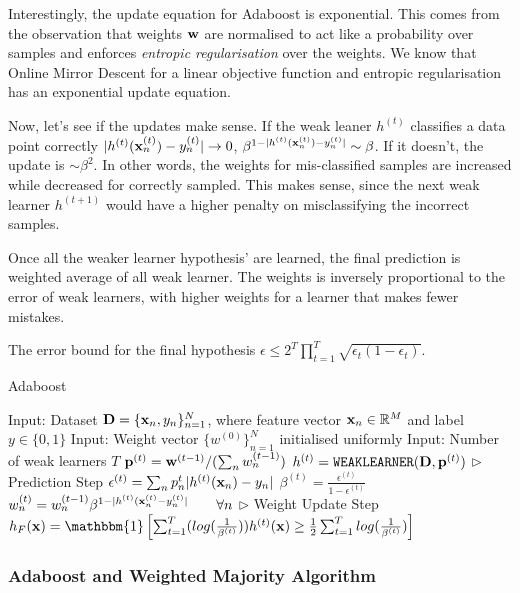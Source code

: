 \documentclass[11pt]{article}
\begin{document}
Interestingly, the update equation for Adaboost is exponential. This comes from the observation that weights $\mathbf{w}$ are normalised to act like a probability over samples and enforces \textit{entropic regularisation} over the weights. We know that Online Mirror Descent for a linear  objective function and entropic regularisation has an exponential update equation.

Now, let's see if the updates make sense. If the weak leaner $h^{(t)}$ classifies a data point correctly \ie $|h^{(t)}(\mathbf{x}_n^{(t)}) - y_n^{(t)}| \rightarrow 0$, $\beta^{1-|h^{(t)}(\mathbf{x}_n^{(t)}) - y_n^{(t)}|} \sim \beta$. If it doesn't, the update is $\sim \beta^2$. In other words, the weights for mis-classified samples are increased while decreased for correctly sampled. This makes sense, since the next weak learner $h^{(t+1)}$ would have a higher penalty on misclassifying the incorrect samples. 

Once all the weaker learner hypothesis' are learned, the final prediction is weighted average of all weak learner. The weights is inversely proportional to the error of weak learners, with higher weights for a learner that makes fewer mistakes.

The error bound for the final hypothesis $\epsilon \le 2^T\prod_{t=1}^{T} \sqrt{\epsilon_t(1 - \epsilon_t)}$. %
\begin{algorithm}[H]
\caption{Adaboost}
\label{algo:adaboost}
\begin{algorithmic}[1]
\STATE Input: Dataset $\mathbf{D} =\{\mathbf{x}_n, y_n\}_{n=1}^{N}$, where feature vector $\mathbf{x}_n \in \mathbb{R}^M$ and label $y \in \{0, 1\}$
\STATE Input: Weight vector $\{w^{(0)}\}_{n=1}^{N}$ initialised uniformly
\STATE Input: Number of weak learners $T$ 
\STATE $\mathbf{p}^{(t)} = \mathbf{w}^{(t-1)}/(\sum_n w_n^{(t-1)})$ 
\STATE $h^{(t)} = \mathtt{WEAKLEARNER}(\mathbf{D}, \mathbf{p}^{(t)})$  \hfill $\triangleright$ Prediction Step
\STATE $\epsilon^{(t)} = \sum_n p^t_n |h^{(t)}(\mathbf{x}_n) - y_n|$
\STATE $\beta^{(t)} = \frac{\epsilon^{(t)}}{1-\epsilon^{(t)}}$
\STATE $w_n^{(t)} = w_n^{(t-1)}\beta^{1-|h^{(t)}(\mathbf{x}_n^{(t)}-y_n^{(t)}|} \qquad \forall n$ \hfill $\triangleright$ Weight Update Step
\ENDFOR
\STATE $h_F(\xv) = \mathbbm{1}\left[\sum_{t=1}^T (log(\frac{1}{\beta^{(t)}}))h^{(t)}(\xv) \ge \frac{1}{2} \sum_{t=1}^{T} log(\frac{1}{\beta^{(t)}})\right]$
\end{algorithmic}
\end{algorithm}

\subsubsection{Adaboost and Weighted Majority Algorithm}
\end{document}
